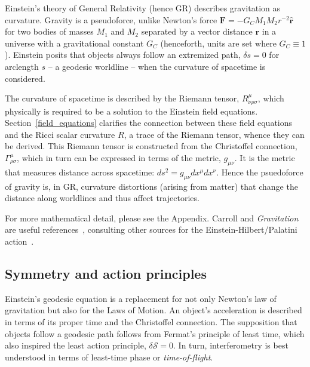         Einstein's theory of General Relativity (hence GR) describes gravitation as curvature. 
Gravity is a pseudoforce, unlike Newton's force $\textbf{F} = -G_C M_1 M_2 r^{-2} \hat{\textbf{r}}$ for two bodies of masses $M_1$ and $M_2$ separated by a vector distance $\textbf{r}$ in a universe with a gravitational constant $G_C$ (henceforth, units are set where $G_C \equiv 1$).
 Einstein posits that objects always follow an extremized path, $\delta s = 0$ for arclength $s$  -- a geodesic worldline -- when the curvature of spacetime is considered. 

The curvature of spacetime is described by the Riemann tensor, $R^\mu_{\nu\rho\sigma}$, which physically is required to be a solution to the Einstein field equations. 
Section~\ref{field_equations} clarifies the connection between these field equations and the Ricci scalar curvature $R$, a trace of the Riemann tensor, whence they can be derived. 
This Riemann tensor is constructed from the Christoffel connection, $\Gamma^\mu_{\rho\sigma}$, which in turn can be expressed in terms of the metric, $g_{\mu \nu}$.
It is the metric that measures distance across spacetime: $ds^2 = g_{\mu\nu} dx^\mu dx^\nu$.
Hence the psuedoforce of gravity is, in GR, curvature distortions (arising from matter) that change the distance along worldlines and thus affect trajectories.

For more mathematical detail, please see the Appendix.
 Carroll and \textit{Gravitation} are useful references~\cite{Carroll1997,MisnerThorneWheeler}, consulting other sources for the Einstein-Hilbert/Palatini action~\cite{FarrThesis}.


        \subsection{Symmetry and action principles}
        \label{principles}

Einstein's geodesic equation is a replacement for not only Newton's law of gravitation but also for the Laws of Motion.
An object's acceleration is described in terms of its proper time and the Christoffel connection.
The supposition that objects follow a geodesic path follows from Fermat's principle of least time, which also inspired the least action principle, $\delta \mathcal{S} = 0$.
In turn, interferometry is best understood in terms of least-time phase or \textit{time-of-flight}.

